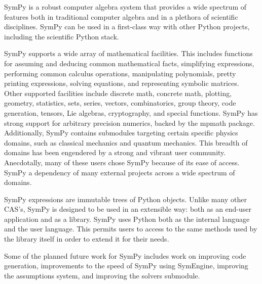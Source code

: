 SymPy is a robust computer algebra system that provides a wide spectrum of
features both in traditional computer algebra and in a plethora of scientific
disciplines. SymPy can be used in a first-class way with other
Python projects, including the scientific Python stack.


SymPy supports a wide array of mathematical facilities. This includes
functions for assuming and deducing common mathematical facts,
simplifying expressions, performing common calculus operations, manipulating polynomials, pretty printing
expressions, solving equations, and representing symbolic matrices. Other supported
facilities
include discrete math, concrete math, plotting, geometry, statistics,
sets, series, vectors, combinatorics, group theory, code
generation, tensors, Lie algebras, cryptography, and special functions.
SymPy has strong support for arbitrary precision numerics, backed by the
mpmath package. Additionally, SymPy contains submodules targeting certain specific physics domains,
such as classical mechanics and quantum mechanics.  This breadth of domains has
been engendered by a strong and vibrant user community.
Anecdotally, many of these users chose SymPy because of its ease of access.
SymPy a dependency of many external projects across a wide
spectrum of domains.

SymPy expressions are immutable trees of Python objects. Unlike many other
CAS's, SymPy is designed to be used in an extensible way: both as an end-user
application and as a library. SymPy uses Python both as the internal language
and the user language. This permits users to access to the same methods used
by the library itself in order to extend it for their needs.


Some of the planned future work for SymPy includes work on improving code
generation, improvements to the speed of SymPy using SymEngine, improving the
assumptions system, and improving the solvers submodule.


